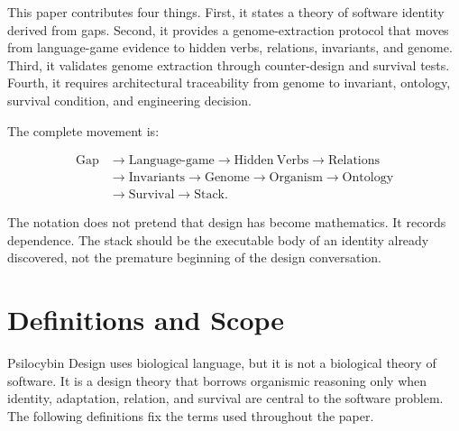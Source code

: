 \documentclass[11pt]{article}
\begin{document}
This paper contributes four things. First, it states a theory of software identity derived from gaps. Second, it provides a genome-extraction protocol that moves from language-game evidence to hidden verbs, relations, invariants, and genome. Third, it validates genome extraction through counter-design and survival tests. Fourth, it requires architectural traceability from genome to invariant, ontology, survival condition, and engineering decision.

The complete movement is:

\[
\begin{aligned}
    \mathrm{Gap} &\rightarrow \mathrm{Language\mbox{-}game} \rightarrow \mathrm{Hidden\ Verbs} \rightarrow \mathrm{Relations} \\
                 &\rightarrow \mathrm{Invariants} \rightarrow \mathrm{Genome} \rightarrow \mathrm{Organism} \rightarrow \mathrm{Ontology} \\
                 &\rightarrow \mathrm{Survival} \rightarrow \mathrm{Stack}.
\end{aligned}
\]

The notation does not pretend that design has become mathematics. It records dependence. The stack should be the executable body of an identity already discovered, not the premature beginning of the design conversation.

\section{Definitions and Scope}

Psilocybin Design uses biological language, but it is not a biological theory of software. It is a design theory that borrows organismic reasoning only when identity, adaptation, relation, and survival are central to the software problem. The following definitions fix the terms used throughout the paper.
\end{document}
